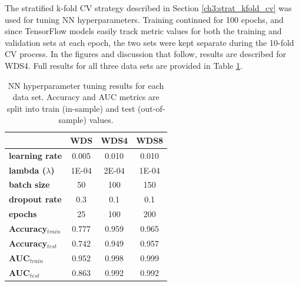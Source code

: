 The stratified k-fold CV strategy described in Section \ref{ch3:strat_kfold_cv} was used for tuning NN hyperparameters. Training continued for 100 epochs, and since TensorFlow models easily track metric values for both the training and validation sets at each epoch, the two sets were kept separate during the 10-fold CV process. In the figures and discussion that follow, results are described for WDS4. Full results for all three data sets are provided in Table \ref{tab:nn_tuning}. 

\begin{table}[htp]
\centering
\begin{tabular}{l|c|c|c|}
\cline{2-4}
                                      & \textbf{WDS}   & \textbf{WDS4}  & \textbf{WDS8}  \\ \hline
\multicolumn{1}{|l|}{\textbf{learning rate}}   & 0.005 & 0.010 & 0.010 \\ \hline
\multicolumn{1}{|l|}{\textbf{lambda ($\lambda$)}}          & 1E-04 & 2E-04 & 1E-04 \\ \hline
\multicolumn{1}{|l|}{\textbf{batch size}}      & 50    & 100   & 150   \\ \hline
\multicolumn{1}{|l|}{\textbf{dropout rate}}    & 0.3   & 0.1   & 0.1   \\ \hline
\multicolumn{1}{|l|}{\textbf{epochs}}          & 25    & 100   & 200   \\ \hline
\multicolumn{1}{|l|}{\textbf{Accuracy$_{train}$}} & 0.777 & 0.959 & 0.965 \\ \hline
\multicolumn{1}{|l|}{\textbf{Accuracy$_{test}$}}  & 0.742 & 0.949 & 0.957 \\ \hline
\multicolumn{1}{|l|}{\textbf{AUC$_{train}$}}      & 0.952 & 0.998 & 0.999 \\ \hline
\multicolumn{1}{|l|}{\textbf{AUC$_{test}$}}       & 0.863 & 0.992 & 0.992 \\ \hline
\end{tabular}
\singlespacing
\caption[Neural network hyperparameter tuning results]{NN hyperparameter tuning results for each data set. Accuracy and AUC metrics are split into train (in-sample) and test (out-of-sample) values.}
\label{tab:nn_tuning}
\end{table}

